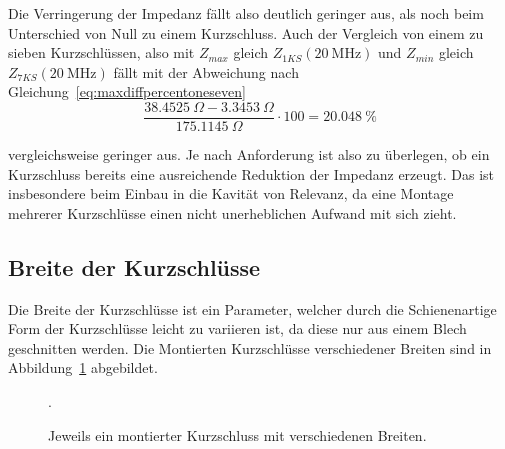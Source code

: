 \par
Die Verringerung der Impedanz f\"allt also deutlich geringer aus, als noch beim Unterschied von Null zu einem Kurzschluss. Auch der Vergleich von einem zu sieben Kurzschl\"ussen, also mit $Z_{max}$ gleich $Z_{1KS}(\SI{20}{\mega\hertz})$ und $Z_{min}$ gleich $Z_{7KS}(\SI{20}{\mega\hertz})$ f\"allt mit der Abweichung nach Gleichung~\ref{eq:maxdiffpercentoneseven}
\begin{equation}
	\frac{\SI{38,4525}{\Omega} - \SI{3,3453}{\Omega}}{\SI{175,1145}{\Omega}}\cdot 100 = \SI{20,048}{\%}
	\label{eq:maxdiffpercentoneseven}
\end{equation}
\par
vergleichsweise geringer aus. Je nach Anforderung ist also zu \"uberlegen, ob ein Kurzschluss bereits eine ausreichende Reduktion der Impedanz erzeugt. Das ist insbesondere beim Einbau in die Kavit\"at von Relevanz, da eine Montage mehrerer Kurzschl\"usse einen nicht unerheblichen Aufwand mit sich zieht. 


\subsection{Breite der Kurzschl\"usse}
Die Breite der Kurzschl\"usse ist ein Parameter, welcher durch die Schienenartige Form der Kurzschl\"usse leicht zu variieren ist, da diese nur aus einem Blech geschnitten werden. Die Montierten Kurzschl\"usse verschiedener Breiten sind in Abbildung~\ref{fig:ringcorewidthCST} abgebildet.
\begin{figure}[htb]
	\centering.
	\hspace{0.02\textwidth}
	\hspace{0.02\textwidth}
	\caption{Jeweils ein montierter Kurzschluss mit verschiedenen Breiten.}
	\label{fig:ringcorewidthCST}
\end{figure}



\newpage



